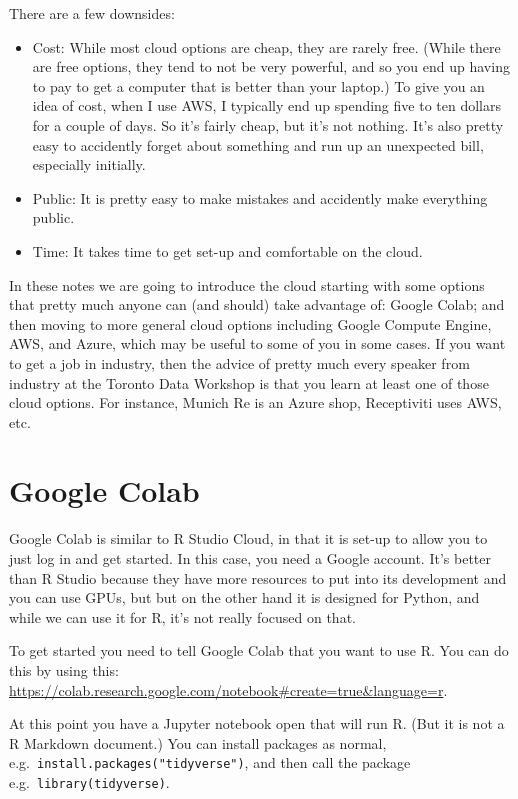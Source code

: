 \documentclass[
]{book}
\providecommand{\tightlist}{%
  \setlength{\itemsep}{0pt}\setlength{\parskip}{0pt}}
\begin{document}
There are a few downsides:

\begin{itemize}
\tightlist
\item
  Cost: While most cloud options are cheap, they are rarely free. (While there are free options, they tend to not be very powerful, and so you end up having to pay to get a computer that is better than your laptop.) To give you an idea of cost, when I use AWS, I typically end up spending five to ten dollars for a couple of days. So it's fairly cheap, but it's not nothing. It's also pretty easy to accidently forget about something and run up an unexpected bill, especially initially.
\item
  Public: It is pretty easy to make mistakes and accidently make everything public.
\item
  Time: It takes time to get set-up and comfortable on the cloud.
\end{itemize}

In these notes we are going to introduce the cloud starting with some options that pretty much anyone can (and should) take advantage of: Google Colab; and then moving to more general cloud options including Google Compute Engine, AWS, and Azure, which may be useful to some of you in some cases. If you want to get a job in industry, then the advice of pretty much every speaker from industry at the Toronto Data Workshop is that you learn at least one of those cloud options. For instance, Munich Re is an Azure shop, Receptiviti uses AWS, etc.

\hypertarget{google-colab}{%
\section{Google Colab}\label{google-colab}}

Google Colab is similar to R Studio Cloud, in that it is set-up to allow you to just log in and get started. In this case, you need a Google account. It's better than R Studio because they have more resources to put into its development and you can use GPUs, but but on the other hand it is designed for Python, and while we can use it for R, it's not really focused on that.

To get started you need to tell Google Colab that you want to use R. You can do this by using this: \url{https://colab.research.google.com/notebook\#create=true\&language=r}.

At this point you have a Jupyter notebook open that will run R. (But it is not a R Markdown document.) You can install packages as normal, e.g.~\texttt{install.packages("tidyverse")}, and then call the package e.g.~\texttt{library(tidyverse)}.
\end{document}
